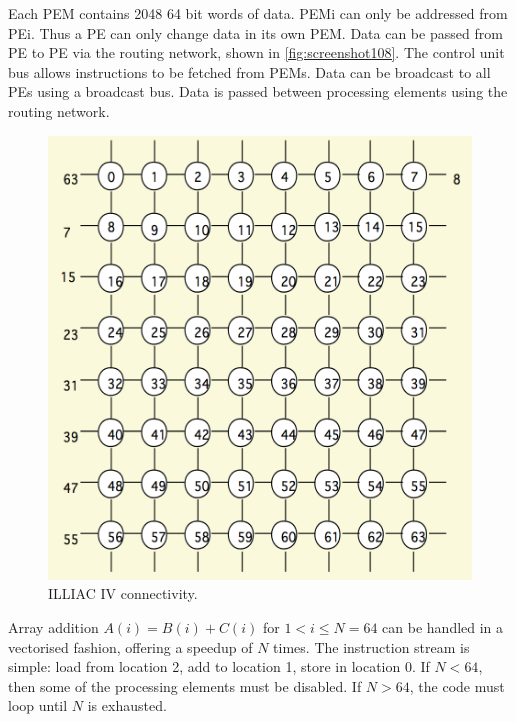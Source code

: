 Each PEM contains 2048 64 bit words of data. PEMi can only be addressed from PEi. Thus a PE can only change data in its own PEM. Data can be passed from PE to PE via the routing network, shown in \autoref{fig:screenshot108}. The control unit bus allows instructions to be fetched from PEMs. Data can be broadcast to all PEs using a broadcast bus. Data is passed between processing elements using the routing network. 

\begin{figure}
\centering
\includegraphics[width=0.7\linewidth]{screenshot108}
\caption{ILLIAC IV connectivity.}
\label{fig:screenshot108}
\end{figure}

Array addition $A(i) = B(i) + C(i)$ for $1 < i \le N = 64$ can be handled in a vectorised fashion, offering a speedup of $N$ times. The instruction stream is simple: load from location 2, add to location 1, store in location 0. If $N < 64$, then some of the processing elements must be disabled. If $N > 64$, the code must loop until $N$ is exhausted.

